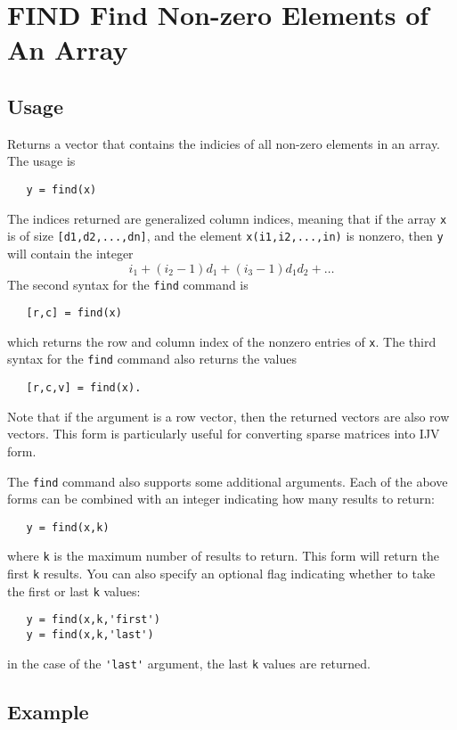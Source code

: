 \section{FIND Find Non-zero Elements of An Array}

\subsection{Usage}

Returns a vector that contains the indicies of all non-zero elements 
in an array.  The usage is
\begin{verbatim}
   y = find(x)
\end{verbatim}
The indices returned are generalized column indices, meaning that if 
the array \verb|x| is of size \verb|[d1,d2,...,dn]|, and the
element \verb|x(i1,i2,...,in)| is nonzero, then \verb|y|
will contain the integer
\[
   i_1 + (i_2-1) d_1 + (i_3-1) d_1 d_2 + \dots
\]
The second syntax for the \verb|find| command is
\begin{verbatim}
   [r,c] = find(x)
\end{verbatim}
which returns the row and column index of the nonzero entries of \verb|x|.
The third syntax for the \verb|find| command also returns the values
\begin{verbatim}
   [r,c,v] = find(x).
\end{verbatim}
Note that if the argument is a row vector, then the returned vectors
are also row vectors. This form is particularly useful for converting 
sparse matrices into IJV form.

The \verb|find| command also supports some additional arguments.  Each of the
above forms can be combined with an integer indicating how many results
to return:
\begin{verbatim}
   y = find(x,k)
\end{verbatim}
where \verb|k| is the maximum number of results to return.  This form will return
the first \verb|k| results.  You can also specify an optional flag indicating 
whether to take the first or last \verb|k| values:
\begin{verbatim}
   y = find(x,k,'first')
   y = find(x,k,'last')
\end{verbatim}
in the case of the \verb|'last'| argument, the last \verb|k| values are returned.
\subsection{Example}

